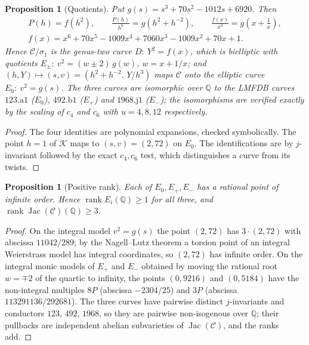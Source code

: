 \documentclass[11pt,letterpaper]{article}
\newtheorem{proposition}[theorem]{Proposition}
\theoremstyle{definition}\newtheorem{definition}[theorem]{Definition}
\theoremstyle{remark}\newtheorem{remark}[theorem]{Remark}
\newcommand{\Q}{\mathbb Q}\newcommand{\Z}{\mathbb Z}\newcommand{\R}{\mathbb R}
\begin{document}
\begin{proposition}[Quotients]\label{prop:quotients}
Put $g(s)=s^3+70s^2-1012s+6920$. Then
\begin{gather*}
 P(h)=f(h^2),\qquad \frac{P(h)}{h^6}=g\!\left(h^2+h^{-2}\right),\qquad \frac{f(x)}{x^3}=g\!\left(x+\frac1x\right),\\
 f(x)=x^6+70x^5-1009x^4+7060x^3-1009x^2+70x+1.
\end{gather*}
Hence $\mathcal C/\sigma_1$ is the genus-two curve $D:\ Y^2=f(x)$, which is bielliptic with quotients $E_\pm:\ v^2=(w\pm2)\,g(w)$, $w=x+1/x$; and $(h,Y)\mapsto(s,v)=(h^2+h^{-2},\,Y/h^3)$ maps $\mathcal C$ onto the elliptic curve $E_0:\ v^2=g(s)$. The three curves are isomorphic over $\Q$ to the LMFDB curves $123.\mathrm{a}1$ ($E_0$), $492.\mathrm{b}1$ ($E_+$) and $1968.\mathrm{j}1$ ($E_-$); the isomorphisms are verified exactly by the scaling of $c_4$ and $c_6$ with $u=4,8,12$ respectively.
\end{proposition}
\begin{proof}
The four identities are polynomial expansions, checked symbolically. The point $h=1$ of $\mathcal K$ maps to $(s,v)=(2,72)$ on $E_0$. The identifications are by $j$-invariant followed by the exact $c_4,c_6$ test, which distinguishes a curve from its twists.
\end{proof}

\begin{proposition}[Positive rank]\label{prop:posrank}
Each of $E_0,E_+,E_-$ has a rational point of infinite order. Hence $\operatorname{rank}E_i(\Q)\ge1$ for all three, and $\operatorname{rank}\operatorname{Jac}(\mathcal C)(\Q)\ge3$.
\end{proposition}
\begin{proof}
On the integral model $v^2=g(s)$ the point $(2,72)$ has $3\cdot(2,72)$ with abscissa $11042/289$; by the Nagell--Lutz theorem a torsion point of an integral Weierstrass model has integral coordinates, so $(2,72)$ has infinite order. On the integral monic models of $E_+$ and $E_-$ obtained by moving the rational root $w=\mp2$ of the quartic to infinity, the points $(0,9216)$ and $(0,5184)$ have the non-integral multiples $8P$ (abscissa $-2304/25$) and $3P$ (abscissa $113291136/292681$). The three curves have pairwise distinct $j$-invariants and conductors $123$, $492$, $1968$, so they are pairwise non-isogenous over $\Q$; their pullbacks are independent abelian subvarieties of $\operatorname{Jac}(\mathcal C)$, and the ranks add.
\end{proof}
\end{document}
